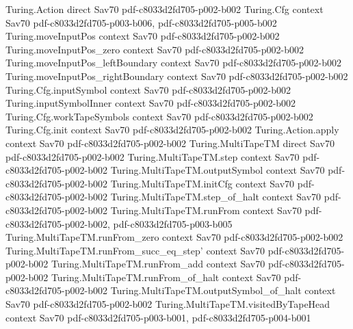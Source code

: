 \begin{theorem}
\label{Complexity.LogProg.SavitchARM.savitch_halts}
\leanok
\proofstep
  {Turing.Action}
  {direct}
  {Sav70}
  {pdf-c8033d2fd705-p002-b002}
\proofstep
  {Turing.Cfg}
  {context}
  {Sav70}
  {pdf-c8033d2fd705-p003-b006,
    pdf-c8033d2fd705-p005-b002}
\proofstep
  {Turing.moveInputPos}
  {context}
  {Sav70}
  {pdf-c8033d2fd705-p002-b002}
\proofstep
  {Turing.moveInputPos_zero}
  {context}
  {Sav70}
  {pdf-c8033d2fd705-p002-b002}
\proofstep
  {Turing.moveInputPos_leftBoundary}
  {context}
  {Sav70}
  {pdf-c8033d2fd705-p002-b002}
\proofstep
  {Turing.moveInputPos_rightBoundary}
  {context}
  {Sav70}
  {pdf-c8033d2fd705-p002-b002}
\proofstep
  {Turing.Cfg.inputSymbol}
  {context}
  {Sav70}
  {pdf-c8033d2fd705-p002-b002}
\proofstep
  {Turing.inputSymbolInner}
  {context}
  {Sav70}
  {pdf-c8033d2fd705-p002-b002}
\proofstep
  {Turing.Cfg.workTapeSymbols}
  {context}
  {Sav70}
  {pdf-c8033d2fd705-p002-b002}
\proofstep
  {Turing.Cfg.init}
  {context}
  {Sav70}
  {pdf-c8033d2fd705-p002-b002}
\proofstep
  {Turing.Action.apply}
  {context}
  {Sav70}
  {pdf-c8033d2fd705-p002-b002}
\proofstep
  {Turing.MultiTapeTM}
  {direct}
  {Sav70}
  {pdf-c8033d2fd705-p002-b002}
\proofstep
  {Turing.MultiTapeTM.step}
  {context}
  {Sav70}
  {pdf-c8033d2fd705-p002-b002}
\proofstep
  {Turing.MultiTapeTM.outputSymbol}
  {context}
  {Sav70}
  {pdf-c8033d2fd705-p002-b002}
\proofstep
  {Turing.MultiTapeTM.initCfg}
  {context}
  {Sav70}
  {pdf-c8033d2fd705-p002-b002}
\proofstep
  {Turing.MultiTapeTM.step_of_halt}
  {context}
  {Sav70}
  {pdf-c8033d2fd705-p002-b002}
\proofstep
  {Turing.MultiTapeTM.runFrom}
  {context}
  {Sav70}
  {pdf-c8033d2fd705-p002-b002,
    pdf-c8033d2fd705-p003-b005}
\proofstep
  {Turing.MultiTapeTM.runFrom_zero}
  {context}
  {Sav70}
  {pdf-c8033d2fd705-p002-b002}
\proofstep
  {Turing.MultiTapeTM.runFrom_succ_eq_step'}
  {context}
  {Sav70}
  {pdf-c8033d2fd705-p002-b002}
\proofstep
  {Turing.MultiTapeTM.runFrom_add}
  {context}
  {Sav70}
  {pdf-c8033d2fd705-p002-b002}
\proofstep
  {Turing.MultiTapeTM.runFrom_of_halt}
  {context}
  {Sav70}
  {pdf-c8033d2fd705-p002-b002}
\proofstep
  {Turing.MultiTapeTM.outputSymbol_of_halt}
  {context}
  {Sav70}
  {pdf-c8033d2fd705-p002-b002}
\proofstep
  {Turing.MultiTapeTM.visitedByTapeHead}
  {context}
  {Sav70}
  {pdf-c8033d2fd705-p003-b001,
    pdf-c8033d2fd705-p004-b001}

\end{theorem}
